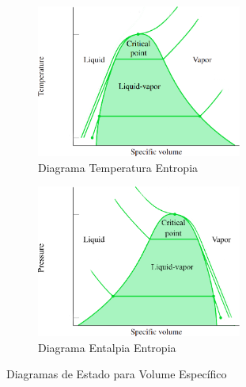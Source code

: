 \documentclass{article}
\begin{document}
            \begin{figure}[h]
                \begin{subfigure}[t]{0.5\textwidth}
                    \centering
                    \includegraphics[height = 5cm]{D. Tv Completo.png}
                    \caption{Diagrama Temperatura Entropia}
                \end{subfigure}
                \begin{subfigure}[t]{0.5\textwidth}
                    \centering
                    \includegraphics[height = 5cm]{D. pv Completo.png}
                    \caption{Diagrama Entalpia Entropia}
                \end{subfigure}
                \caption{Diagramas de Estado para Volume Específico}
            \end{figure}
\end{document}
